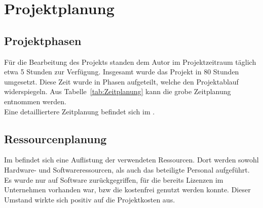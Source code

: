 \section{Projektplanung} 
\label{sec:Projektplanung}

\subsection{Projektphasen}
\label{sec:Projektphasen}
Für die Bearbeitung des Projekts standen dem Autor im Projektzeitraum täglich etwa 5 Stunden zur Verfügung.
Insgesamt wurde das Projekt in 80 Stunden umgesetzt. Diese Zeit wurde in Phasen aufgeteilt, welche den
Projektablauf widerspiegeln. Aus Tabelle~\ref{tab:Zeitplanung} kann die grobe Zeitplanung entnommen werden.
\\
Eine detailliertere Zeitplanung befindet sich im .


\subsection{Ressourcenplanung}
\label{sec:Ressourcenplanung}
Im  befindet sich eine Auflistung der verwendeten Ressourcen.
Dort werden sowohl Hardware- und Softwareressourcen, als auch das beteiligte Personal aufgeführt.
Es wurde nur auf Software zurückgegriffen, für die bereits Lizenzen im Unternehmen vorhanden war,
\acs{bzw} die kostenfrei genutzt werden konnte. Dieser Umstand wirkte sich positiv auf die Projektkosten aus.

